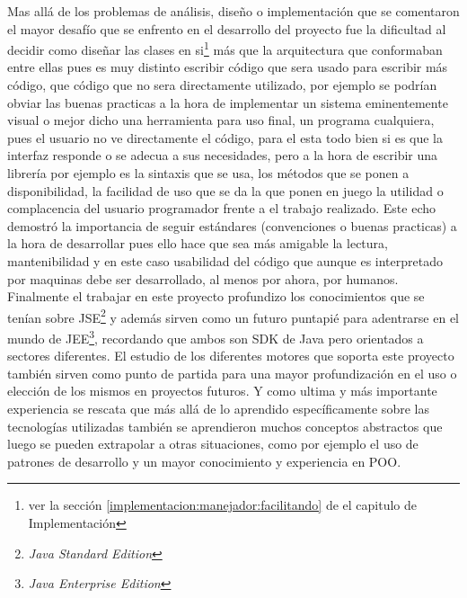 Mas allá de los problemas de análisis, diseño o implementación que se comentaron
el mayor desafío que se enfrento en el desarrollo del proyecto fue la dificultad al decidir como diseñar las clases en si\footnote{ver la sección \ref{implementacion:manejador:facilitando} de el capitulo de Implementación} más que la arquitectura que conformaban entre ellas pues es muy distinto escribir código que sera usado para escribir más código, que código que no sera directamente utilizado, por ejemplo se podrían obviar las buenas practicas a la hora de implementar un sistema eminentemente visual o mejor dicho una herramienta para uso final, un programa cualquiera, pues el usuario no ve directamente el código, para el esta todo bien si es que la interfaz responde o se adecua a sus necesidades, pero a la hora de escribir una librería por ejemplo es la sintaxis que se usa, los métodos que se ponen a disponibilidad, la facilidad de uso que se da la que ponen en juego la utilidad o complacencia del usuario programador frente a el trabajo realizado. Este echo demostró la importancia de seguir estándares (convenciones o buenas practicas) a la hora de desarrollar pues ello hace que sea más amigable la lectura, mantenibilidad y en este caso usabilidad del código que aunque es interpretado por maquinas debe ser desarrollado, al menos por ahora, por humanos.
\newpage
Finalmente el trabajar en este proyecto profundizo los conocimientos que se tenían sobre JSE\footnote{\textit{Java Standard Edition}} y además sirven como un futuro puntapié para adentrarse en el mundo de JEE\footnote{\textit{Java Enterprise Edition}}, recordando que ambos son SDK de Java pero orientados a sectores diferentes. El estudio de los diferentes motores que soporta este proyecto también sirven como punto de partida para una mayor profundización en el uso o elección de los mismos en proyectos futuros. Y como ultima y más importante experiencia se rescata que más allá de lo aprendido específicamente sobre las tecnologías utilizadas también se aprendieron muchos conceptos abstractos que luego se pueden extrapolar a otras situaciones, como por ejemplo el uso de patrones de desarrollo y un mayor conocimiento y experiencia en POO.